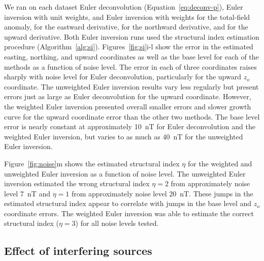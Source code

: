 We ran on each dataset Euler deconvolution (Equation~\ref{eq:deconv-p}), Euler inversion with unit weights, and Euler inversion with weights \SynNoiseWeightsF{} for the total-field anomaly, \SynNoiseWeightsE{} for the eastward derivative, \SynNoiseWeightsN{} for the northward derivative, and \SynNoiseWeightsU{} for the upward derivative.
Both Euler inversion runs used the structural index estimation procedure (Algorithm~\ref{alg:si}).
Figures~\ref{fig:si}i-l show the error in the estimated easting, northing, and upward coordinates as well as the base level for each of the methods as a function of noise level.
The error in each of three coordinates raises sharply with noise level for Euler deconvolution, particularly for the upward $z_o$ coordinate.
The unweighted Euler inversion results vary less regularly but present errors just as large as Euler deconvolution for the upward coordinate.
However, the weighted Euler inversion presented overall smaller errors and slower growth curve for the upward coordinate error than the other two methods.
The base level error is nearly constant at approximately \qty{10}{\nano\tesla} for Euler deconvolution and the weighted Euler inversion, but varies to as much as \qty{40}{\nano\tesla} for the unweighted Euler inversion.

Figure~\ref{fig:noise}m shows the estimated structural index $\eta$ for the weighted and unweighted Euler inversion as a function of noise level.
The unweighted Euler inversion estimated the wrong structural index $\eta=2$ from approximately noise level \qty{7}{\nano\tesla} and $\eta=1$ from approximately noise level \qty{20}{\nano\tesla}.
These jumps in the estimated structural index appear to correlate with jumps in the base level and $z_o$ coordinate errors.
The weighted Euler inversion was able to estimate the correct structural index ($\eta=3$) for all noise levels tested.


\subsection{Effect of interfering sources}
\label{sec:interf}

